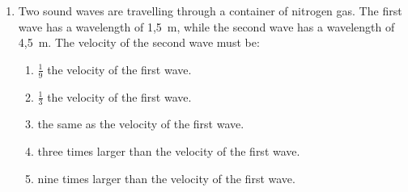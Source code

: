 \begin{eocexercises}{}
\begin{enumerate}
\item Two sound waves are travelling through a container of nitrogen gas. The first wave has a wavelength of 1,5~m, while the second wave has a wavelength of 4,5~m. The velocity of the second wave must be:
\begin{enumerate}[label=\textbf{\alph*}.]
\item{$\frac{1}{9}$ the velocity of the first wave.}
\item{$\frac{1}{3}$ the velocity of the first wave.}
\item{the same as the velocity of the first wave.}
\item{three times larger than the velocity of the first wave.}
\item{nine times larger than the velocity of the first wave.}
\end{enumerate}


\end{enumerate}
\end{eocexercises}

